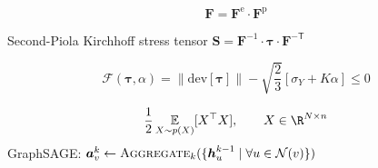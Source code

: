 
\begin{equation}
\bm{F} = \bm{F}^\mathrm{e} \cdot \bm{F}^\mathrm{p}
\end{equation}

Second-Piola Kirchhoff stress tensor $\bm{S} = \bm{F}^{-1} \cdot \bm{\tau} \cdot \bm{F}^\mathsf{-T}$

\begin{equation}
\mathscr{F} (\bm{\tau}, \alpha) = \| \mathrm{dev}[\bm{\tau}] \| - \sqrt{\frac{2}{3}} \left[ \sigma_Y + K\alpha \right] \le 0
\end{equation}

\[\frac12\operatorname*{\mathbb{E}}_{X\sim p(X)}[X^\top X] ,\qquad X\in\R^{N\times n}\]
GraphSAGE: $\boldsymbol{a}_v^k \leftarrow \textsc{Aggregate}_k(\{\boldsymbol{h}_u^{k-1}\mid \forall u\in\mathcal{N}(v)\})$

